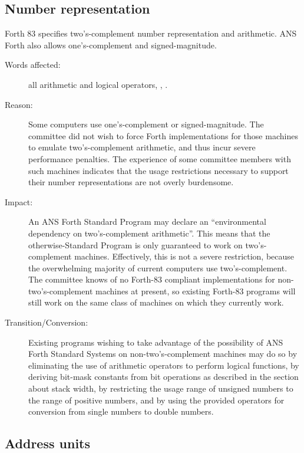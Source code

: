 \subsection{Number representation} %

Forth 83 specifies two's-complement number representation and
arithmetic. ANS Forth also allows one's-complement and
signed-magnitude.

\begin{description}
\item[Words affected:]
	all arithmetic and logical operators,
	,
	.

\item[Reason:]
	Some computers use one's-complement or signed-magnitude. The
	committee did not wish to force Forth implementations for those
	machines to emulate two's-complement arithmetic, and thus incur
	severe performance penalties. The experience of some committee
	members with such machines indicates that the usage restrictions
	necessary to support their number representations are not overly
	burdensome.

\item[Impact:]
	An ANS Forth Standard Program may declare an ``environmental
	dependency on two's-complement arithmetic''. This means that the
	otherwise-Standard Program is only guaranteed to work on
	two's-complement machines. Effectively, this is not a severe
	restriction, because the overwhelming majority of current
	computers use two's-complement. The committee knows of no Forth-83
	compliant implementations for non-two's-complement machines at
	present, so existing Forth-83 programs will still work on the same
	class of machines on which they currently work.

\item[Transition/Conversion:]
	Existing programs wishing to take advantage of the possibility of
	ANS Forth Standard Systems on non-two's-complement machines may
	do so by eliminating the use of arithmetic operators to perform
	logical functions, by deriving bit-mask constants from bit
	operations as described in the section about stack width, by
	restricting the usage range of unsigned numbers to the range of
	positive numbers, and by using the provided operators for
	conversion from single numbers to double numbers.
\end{description}

\subsection{Address units} %

